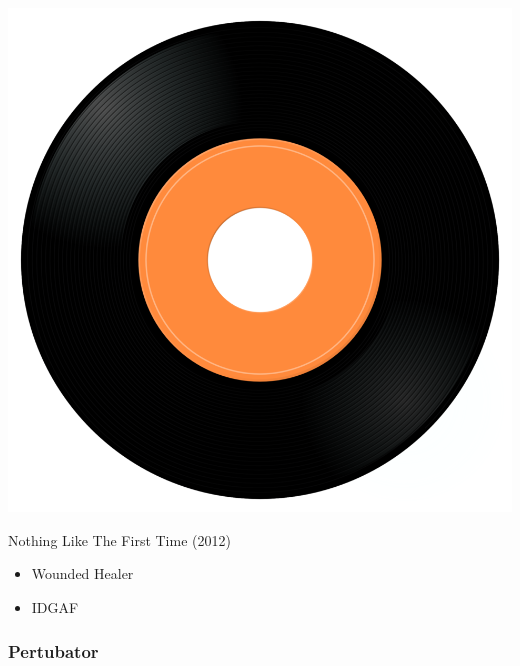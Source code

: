 \begin{minipage}[t]{0.25\textwidth}\vspace{0pt}
\captionsetup{type=figure}
\includegraphics[width=\textwidth]{Images/cover.png}
\caption*{Nothing Like The First Time (2012)}
\end{minipage}
\begin{minipage}[t]{0.25\textwidth}\vspace{0pt}
\begin{itemize}[nosep,leftmargin=1em,labelwidth=*,align=left]
	\setlength{\itemsep}{0pt}
	\item Wounded Healer
	\item IDGAF
\end{itemize}
\end{minipage}

\subsubsection{Pertubator}

